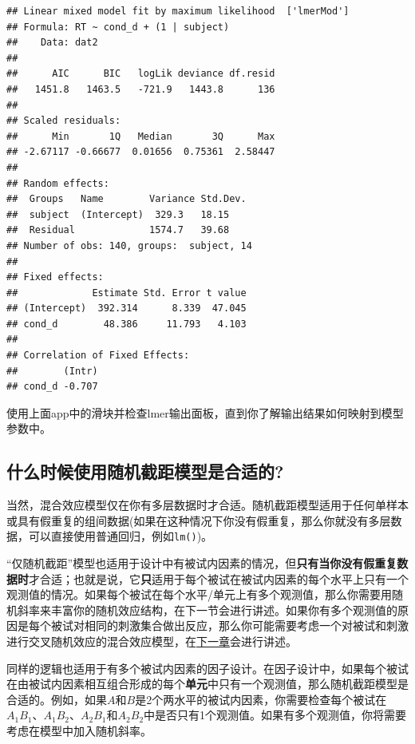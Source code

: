 \documentclass[
]{book}
\begin{document}
\begin{verbatim}
## Linear mixed model fit by maximum likelihood  ['lmerMod']
## Formula: RT ~ cond_d + (1 | subject)
##    Data: dat2
## 
##      AIC      BIC   logLik deviance df.resid 
##   1451.8   1463.5   -721.9   1443.8      136 
## 
## Scaled residuals: 
##      Min       1Q   Median       3Q      Max 
## -2.67117 -0.66677  0.01656  0.75361  2.58447 
## 
## Random effects:
##  Groups   Name        Variance Std.Dev.
##  subject  (Intercept)  329.3   18.15   
##  Residual             1574.7   39.68   
## Number of obs: 140, groups:  subject, 14
## 
## Fixed effects:
##             Estimate Std. Error t value
## (Intercept)  392.314      8.339  47.045
## cond_d        48.386     11.793   4.103
## 
## Correlation of Fixed Effects:
##        (Intr)
## cond_d -0.707
\end{verbatim}

使用上面app中的滑块并检查lmer输出面板，直到你了解输出结果如何映射到模型参数中。

\hypertarget{ux4ec0ux4e48ux65f6ux5019ux4f7fux7528ux968fux673aux622aux8dddux6a21ux578bux662fux5408ux9002ux7684}{%
\subsection{什么时候使用随机截距模型是合适的?}\label{ux4ec0ux4e48ux65f6ux5019ux4f7fux7528ux968fux673aux622aux8dddux6a21ux578bux662fux5408ux9002ux7684}}

当然，混合效应模型仅在你有多层数据时才合适。随机截距模型适用于任何单样本或具有假重复的组间数据(如果在这种情况下你没有假重复，那么你就没有多层数据，可以直接使用普通回归，例如\texttt{lm()})。

``仅随机截距''模型也适用于设计中有被试内因素的情况，但\textbf{只有当你没有假重复数据时}才合适；也就是说，它\textbf{只}适用于每个被试在被试内因素的每个水平上只有一个观测值的情况。如果每个被试在每个水平/单元上有多个观测值，那么你需要用随机斜率来丰富你的随机效应结构，在下一节会进行讲述。如果你有多个观测值的原因是每个被试对相同的刺激集合做出反应，那么你可能需要考虑一个对被试和刺激进行交叉随机效应的混合效应模型，在\href{交叉随机因子线性混合效应模型.html}{下一章}会进行讲述。

同样的逻辑也适用于有多个被试内因素的因子设计。在因子设计中，如果每个被试在由被试内因素相互组合形成的每个\textbf{单元}中只有一个观测值，那么随机截距模型是合适的。例如，如果\(A\)和\(B\)是2个两水平的被试内因素，你需要检查每个被试在\(A_1B_1\)、\(A_1B_2\)、\(A_2B_1\)和\(A_2B_2\)中是否只有1个观测值。如果有多个观测值，你将需要考虑在模型中加入随机斜率。
\end{document}
